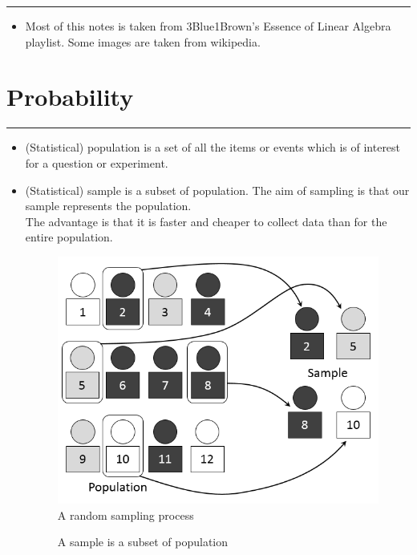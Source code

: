 \documentclass[	DIV=calc,%
paper=a4,%
fontsize=11pt,%
twocolumn]{scrartcl} %
\newcommand{\hformbar}[1]{\vspace{5pt}\hrule\vspace{10pt}} %
\newcommand{\formdesc}[1]{\noindent\textbf{#1}}
\begin{document}
\hformbar
\formdesc{Credits:}
\begin{itemize}
	\item Most of this notes is taken from 3Blue1Brown's Essence of Linear Algebra playlist. Some images are taken from wikipedia.
\end{itemize}

\newpage
\section{Probability}


\hformbar
\formdesc{Population and Sample:} 
\begin{itemize}
	\item (Statistical) population is a set of all the items or events which is of interest for a question or experiment.
	\item (Statistical) sample is a subset of population. The aim of sampling is that our sample represents the population.\\ The advantage is that it is faster and cheaper to collect data than for the entire population.
	
	\begin{figure}[ht!]
		\caption{A random sampling process}
		\graphicspath{ {images/math/} }
		\includegraphics[width=\linewidth]{simple_random_sampling}
	\end{figure}
	
	\begin{figure}[ht!]
		\centering
		\caption{A sample is a subset of population}
	\end{figure}
\end{itemize}
\end{document}
